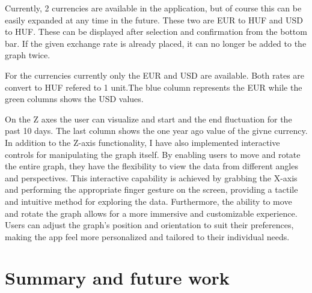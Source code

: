 \documentclass[a4paper,oneside]{article}
\begin{document}
Currently, 2 currencies are available in the application, but of course this can be easily expanded at any time in the future. These two are EUR to HUF and USD to HUF. These can be displayed after selection and confirmation from the bottom bar. If the given exchange rate is already placed, it can no longer be added to the graph twice.

For the currencies currently only the EUR and USD are available. Both rates are convert to HUF refered to 1 unit.The blue column represents the EUR while the green columns shows the USD values.

On the Z axes the user can visualize and start and the end fluctuation for the past 10 days. The last column shows the one year ago value of the givne currency.
In addition to the Z-axis functionality, I have also implemented interactive controls for manipulating the graph itself.
By enabling users to move and rotate the entire graph, they have the flexibility to view the data from different angles and perspectives. This interactive capability is achieved by grabbing the X-axis and performing the appropriate finger gesture on the screen, providing a tactile and intuitive method for exploring the data.
Furthermore, the ability to move and rotate the graph allows for a more immersive and customizable experience. Users can adjust the graph's position and orientation to suit their preferences, making the app feel more personalized and tailored to their individual needs.






\section{Summary and future work}
\label{sec:osszefoglalas}
\end{document}
